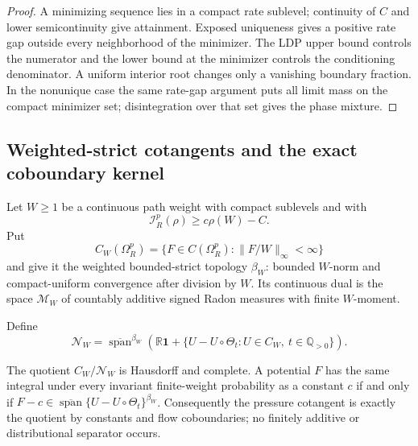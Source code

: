\begin{proof}
A minimizing sequence lies in a compact rate sublevel; continuity of \(C\)
and lower semicontinuity give attainment.  Exposed uniqueness gives a positive
rate gap outside every neighborhood of the minimizer.  The LDP upper bound
controls the numerator and the lower bound at the minimizer controls the
conditioning denominator.  A uniform interior root changes only a vanishing
boundary fraction.  In the nonunique case the same rate-gap argument puts all
limit mass on the compact minimizer set; disintegration over that set gives
the phase mixture.
\end{proof}

\subsection{Weighted-strict cotangents and the exact coboundary kernel}

Let \(W\ge1\) be a continuous path weight with compact sublevels and with
\[
 \mathcal I_R^p(\rho)\ge c\rho(W)-C.
\]
Put
\[
 C_W(\Omega_R^p)
 =\{F\in C(\Omega_R^p):\|F/W\|_\infty<\infty\}
\]
and give it the weighted bounded-strict topology \(\beta_W\): bounded
\(W\)-norm and compact-uniform convergence after division by \(W\).  Its
continuous dual is the space \(\mathcal M_W\) of countably additive signed
Radon measures with finite \(W\)-moment.

Define
\[
 \mathscr N_W=
 \overline{\operatorname{span}}^{\beta_W}
 \left(
 \mathbb R\mathbf1+
 \{U-U\circ\Theta_t:
 U\in C_W,\ t\in\mathbb Q_{>0}\}
 \right).
\]

\begin{theorem}
\label{thm:r3-a3-cotangent}
The quotient \(C_W/\mathscr N_W\) is Hausdorff and complete.  A potential
\(F\) has the same integral under every invariant finite-weight probability
as a constant \(c\) if and only if
\(F-c\in\overline{\operatorname{span}}
\{U-U\circ\Theta_t\}^{\beta_W}\).  Consequently the pressure cotangent is
exactly the quotient by constants and flow coboundaries; no finitely additive
or distributional separator occurs.
\end{theorem}

